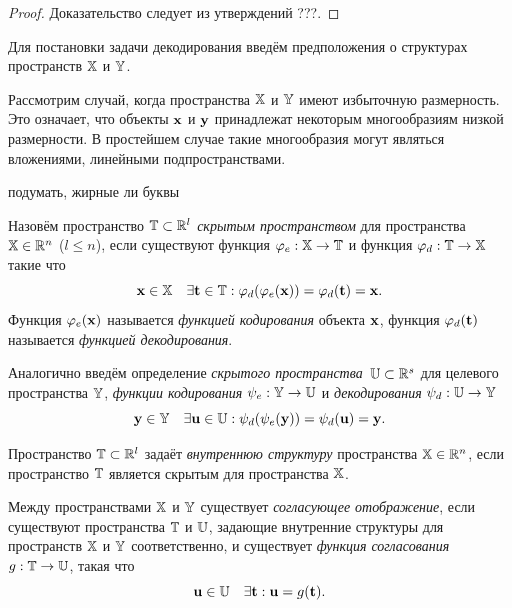 \begin{proof}
	 Доказательство следует из утверждений ???.
\end{proof}

\hrulefill

Для постановки задачи декодирования введём предположения о структурах пространств $\mathbb{X}$ и $\mathbb{Y}$.
\begin{assumption}
	Рассмотрим случай, когда пространства $\mathbb{X}$ и $\mathbb{Y}$ имеют избыточную размерность. 
	Это означает, что объекты $\mathbf{x}$ и $\mathbf{y}$ принадлежат некоторым многообразиям низкой размерности. В простейшем случае такие многообразия могут являться вложениями, линейными подпространствами.
\end{assumption}

{\color{red} подумать, жирные ли буквы}

\begin{definition}
	Назовём пространство $\mathbb{T} \subset \mathbb{R}^l$ \textit{скрытым пространством} для пространства $\mathbb{X} \in \mathbb{R}^n$ ($l \leq n$), если существуют функция $\varphi_e: \mathbb{X} \to \mathbb{T}$ и функция $\varphi_d: \mathbb{T}  \to \mathbb{X}$ такие что
	\[
	\mathbf{x} \in \mathbb{X} \quad \exists \mathbf{t} \in \mathbb{T}: \varphi_d (\varphi_e(\mathbf{x})) = \varphi_d(\mathbf{t}) = \mathbf{x}.
	\]
	Функция $\varphi_e(\mathbf{x})$ называется \textit{функцией кодирования} объекта $\mathbf{x}$, функция $\varphi_d(\mathbf{t})$  называется \textit{функцией декодирования}. 
	
	Аналогично введём определение \textit{скрытого пространства}~$\mathbb{U} \subset \mathbb{R}^s$ для целевого пространства $\mathbb{Y}$, \textit{функции кодирования} $\psi_e: \mathbb{Y} \to \mathbb{U}$ и \textit{декодирования} $\psi_d: \mathbb{U}  \to \mathbb{Y}$
	\[
	 \mathbf{y} \in \mathbb{Y} \quad  \exists \mathbf{u} \in \mathbb{U}: \psi_d (\psi_e(\mathbf{y})) = \psi_d(\mathbf{u}) = \mathbf{y}.
	\]
\end{definition}

\begin{definition}
	Пространство $\mathbb{T} \subset \mathbb{R}^l$ задаёт \textit{внутреннюю структуру} пространства $\mathbb{X} \in \mathbb{R}^n$, если пространство $\mathbb{T}$ является скрытым для пространства $\mathbb{X}$.
\end{definition}

\begin{definition}
	Между пространствами $\mathbb{X}$ и $\mathbb{Y}$ существует \textit{согласующее отображение}, если существуют пространства $\mathbb{T}$ и $\mathbb{U}$, задающие внутренние структуры для пространств $\mathbb{X}$ и $\mathbb{Y}$ соответственно, и существует \textit{функция согласования} $g: \mathbb{T} \rightarrow \mathbb{U}$, такая что
	\[
	\mathbf{u} \in \mathbb{U} \quad \exists \mathbf{t}:  \mathbf{u} = g(\mathbf{t}).
	\]
\end{definition}

